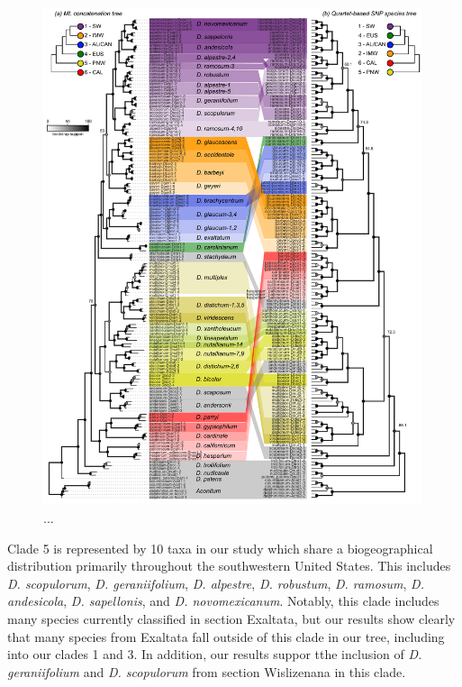\documentclass[11pt]{article}
\begin{document}
\begin{figure}[p]
	\centering
	\includegraphics[width=0.99\textwidth]{./figures/trees_v2.pdf}
	\caption{...
	}
	\label{fig:2}
\end{figure}



Clade 5 is represented by 10 taxa in our study which share a biogeographical
distribution primarily throughout the southwestern United States. This 
includes \emph{D. scopulorum}, \emph{D. geraniifolium}, \emph{D. alpestre},
\emph{D. robustum}, \emph{D. ramosum}, \emph{D. andesicola}, \emph{D. sapellonis},
and \emph{D. novomexicanum}. Notably, this clade includes many species 
currently classified in section Exaltata, but our results show clearly that 
many species from Exaltata fall outside of this clade in our tree, including
into our clades 1 and 3. In addition, our results suppor tthe inclusion of 
\emph{D. geraniifolium} and \emph{D. scopulorum} from section Wislizenana
in this clade.
\end{document}
